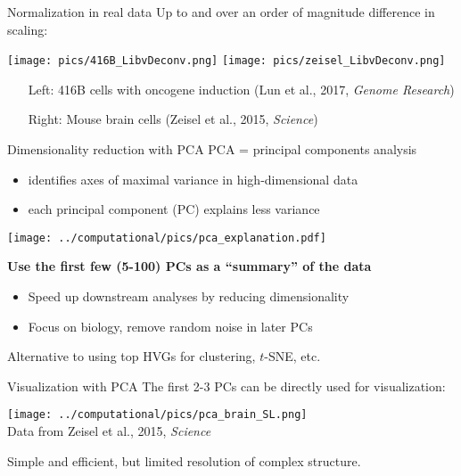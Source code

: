 \documentclass{beamer}
\begin{document}
\begin{frame}{Normalization in real data}
Up to and over an order of magnitude difference in scaling:
\begin{center}
\texttt{[image: pics/416B\_LibvDeconv.png]}\vspace{0.1in}
\texttt{[image: pics/zeisel\_LibvDeconv.png]}
\end{center}
\begin{itemize}
\item[Left:] 416B cells with oncogene induction {\tiny (Lun et al., 2017, \textit{Genome Research})}
\item[Right:] Mouse brain cells {\tiny (Zeisel et al., 2015, \textit{Science})}
\end{itemize}
\end{frame}

\begin{frame}{Dimensionality reduction with PCA}
PCA = principal components analysis
\begin{itemize}
\item identifies axes of maximal variance in high-dimensional data
\item each principal component (PC) explains less variance 
\end{itemize}
\begin{center}
\texttt{[image: ../computational/pics/pca\_explanation.pdf]}
\end{center}
\textbf{Use the first few (5-100) PCs as a ``summary'' of the data}
\begin{itemize}
\item Speed up downstream analyses by reducing dimensionality
\item Focus on biology, remove random noise in later PCs
\end{itemize}
\vspace{0.1in}
Alternative to using top HVGs for clustering, $t$-SNE, etc.
\end{frame}

\begin{frame}{Visualization with PCA}
The first 2-3 PCs can be directly used for visualization:
\begin{center}
\texttt{[image: ../computational/pics/pca\_brain\_SL.png]} \\
    {\tiny Data from Zeisel et al., 2015, \textit{Science}}
\end{center}
Simple and efficient, but limited resolution of complex structure.
\end{frame}
\end{document}
